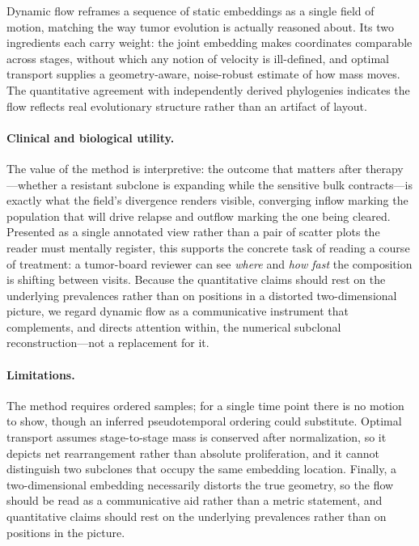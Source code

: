 \documentclass{article}
\begin{document}
Dynamic flow reframes a sequence of static embeddings as a single field of motion,
matching the way tumor evolution is actually reasoned about. Its two ingredients each
carry weight: the joint embedding makes coordinates comparable across stages, without
which any notion of velocity is ill-defined, and optimal transport supplies a
geometry-aware, noise-robust estimate of how mass moves. The quantitative agreement
with independently derived phylogenies indicates the flow reflects real evolutionary
structure rather than an artifact of layout.

\paragraph{Clinical and biological utility.} The value of the method is
interpretive: the outcome that matters after therapy---whether a resistant subclone
is expanding while the sensitive bulk contracts---is exactly what the field's
divergence renders visible, converging inflow marking the population that will drive
relapse and outflow marking the one being cleared. Presented as a single annotated
view rather than a pair of scatter plots the reader must mentally register, this
supports the concrete task of reading a course of treatment: a tumor-board reviewer
can see \emph{where} and \emph{how fast} the composition is shifting between visits.
Because the quantitative claims should rest on the underlying prevalences rather than
on positions in a distorted two-dimensional picture, we regard dynamic flow as a
communicative instrument that complements, and directs attention within, the numerical
subclonal reconstruction---not a replacement for it.

\paragraph{Limitations.} The method requires ordered samples; for a single time point
there is no motion to show, though an inferred pseudotemporal ordering could
substitute. Optimal transport assumes stage-to-stage mass is conserved after
normalization, so it depicts net rearrangement rather than absolute proliferation, and
it cannot distinguish two subclones that occupy the same embedding location. Finally, a
two-dimensional embedding necessarily distorts the true geometry, so the flow should be
read as a communicative aid rather than a metric statement, and quantitative claims
should rest on the underlying prevalences rather than on positions in the picture.
\end{document}
